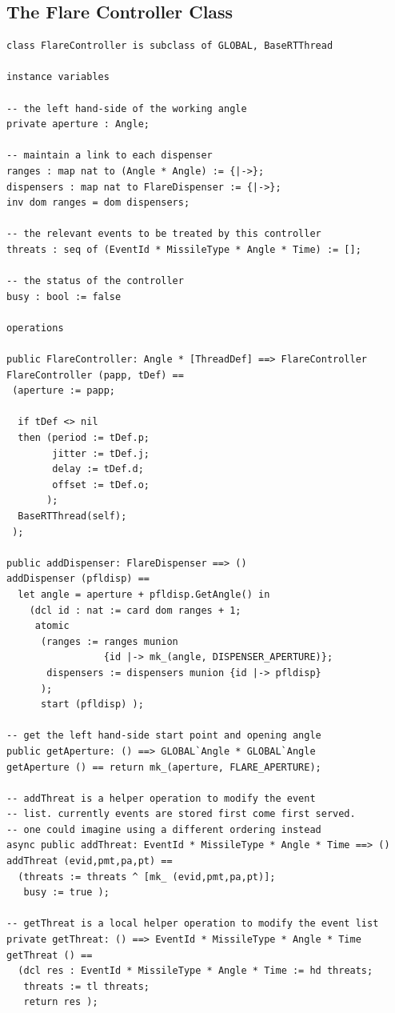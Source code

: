 \documentclass{overturerepchap}
\begin{document}
\subsection{The Flare Controller Class}

\begin{lstlisting}
class FlareController is subclass of GLOBAL, BaseRTThread

instance variables

-- the left hand-side of the working angle
private aperture : Angle;

-- maintain a link to each dispenser
ranges : map nat to (Angle * Angle) := {|->};
dispensers : map nat to FlareDispenser := {|->};
inv dom ranges = dom dispensers;
 
-- the relevant events to be treated by this controller
threats : seq of (EventId * MissileType * Angle * Time) := [];

-- the status of the controller
busy : bool := false

operations

public FlareController: Angle * [ThreadDef] ==> FlareController  
FlareController (papp, tDef) == 
 (aperture := papp;
 
  if tDef <> nil
  then (period := tDef.p;
        jitter := tDef.j;
        delay := tDef.d;
        offset := tDef.o;
       ); 
  BaseRTThread(self);
 );

public addDispenser: FlareDispenser ==> ()
addDispenser (pfldisp) ==
  let angle = aperture + pfldisp.GetAngle() in
    (dcl id : nat := card dom ranges + 1;
     atomic
      (ranges := ranges munion 
                 {id |-> mk_(angle, DISPENSER_APERTURE)};
       dispensers := dispensers munion {id |-> pfldisp}
      );
      start (pfldisp) );

-- get the left hand-side start point and opening angle
public getAperture: () ==> GLOBAL`Angle * GLOBAL`Angle
getAperture () == return mk_(aperture, FLARE_APERTURE);

-- addThreat is a helper operation to modify the event
-- list. currently events are stored first come first served.
-- one could imagine using a different ordering instead
async public addThreat: EventId * MissileType * Angle * Time ==> ()
addThreat (evid,pmt,pa,pt) ==
  (threats := threats ^ [mk_ (evid,pmt,pa,pt)];
   busy := true );

-- getThreat is a local helper operation to modify the event list
private getThreat: () ==> EventId * MissileType * Angle * Time
getThreat () ==
  (dcl res : EventId * MissileType * Angle * Time := hd threats;
   threats := tl threats;
   return res );


\end{lstlisting}
\end{document}
